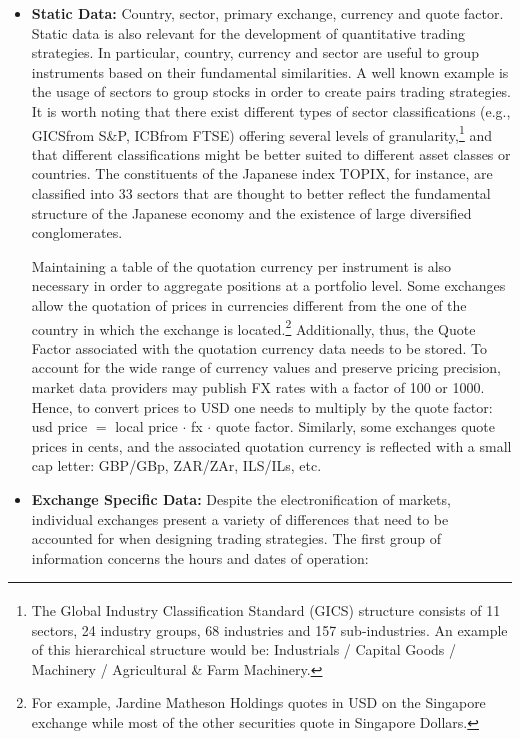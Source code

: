 \begin{itemize}
\item \textbf{Static Data:} Country, sector, primary exchange, currency and quote factor.
Static data is also relevant for the development of quantitative trading strategies. In particular, country, currency and sector are useful to group instruments based on their fundamental similarities. A well known example is the usage of sectors to group stocks in order to create pairs trading strategies. It is worth noting that there exist different types of sector classifications (e.g., GICS\textsuperscript\textregistered from S\&P, ICB\textsuperscript\textregistered from FTSE) offering several levels of granularity,\footnote{The Global Industry Classification Standard (GICS\textsuperscript\textregistered) structure consists of 11 sectors, 24 industry groups, 68 industries and 157 sub-industries. An example of this hierarchical structure would be: Industrials / Capital Goods / Machinery / Agricultural \& Farm Machinery.} and that different classifications might be better suited to different asset classes or countries. The constituents of the Japanese index TOPIX, for instance, are classified into 33 sectors that are thought to better reflect the fundamental structure of the Japanese economy and the existence of large diversified conglomerates. 


Maintaining a table of the quotation currency per instrument is also necessary in order to aggregate positions at a portfolio level. Some exchanges allow the quotation of prices in currencies different from the one of the country in which the exchange is located.\footnote{For example, Jardine Matheson Holdings quotes in USD on the Singapore exchange while most of the other securities quote in Singapore Dollars.} Additionally, thus, the Quote Factor associated with the quotation currency data needs to be stored. To account for the wide range of currency values and preserve pricing precision, market data providers may publish FX rates with a factor of 100 or 1000. Hence, to convert prices to USD one needs to multiply by the quote factor: usd price $=$ local price $\cdot$ fx $\cdot$ quote factor. Similarly, some exchanges quote prices in cents, and the associated quotation currency is reflected with a small cap letter: GBP/GBp, ZAR/ZAr, ILS/ILs, etc.


\item \textbf{Exchange Specific Data:}  Despite the electronification of markets, individual exchanges present a variety of differences that need to be accounted for when designing trading strategies. The first group of information concerns the hours and dates of operation:


\end{itemize}
